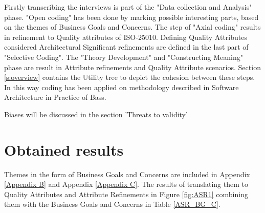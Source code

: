 Firstly transcribing the interviews is part of the "Data collection and Analysis" phase. "Open coding" has been done by marking possible interesting parts, based on the themes of Business Goals and Concerns. The step of "Axial coding" results in refinement to Quality attributes of ISO-25010. Defining Quality Attributes considered Architectural Significant refinements are defined in the last part of "Selective Coding". The "Theory Development" and "Constructing Meaning" phase are result in Attribute refinements and Quality Attribute scenarios. Section \ref{s:overview} contains the Utility tree to depict the cohesion between these steps. In this way coding has been applied on methodology described in Software Architecture in Practice of Bass\etal \cite{Bass2015SoftwareAI}.

Biases will be discussed in the section 'Threats to validity'

\section{Obtained results}
Themes in the form of Business Goals and Concerns are included in Appendix \ref{Appendix B} and Appendix \ref{Appendix C}. The results of translating them to Quality Attributes and Attribute Refinements in Figure \ref{fig:ASR1} combining them with the Business Goals and Concerns in Table \ref{ASR_BG_C}.




